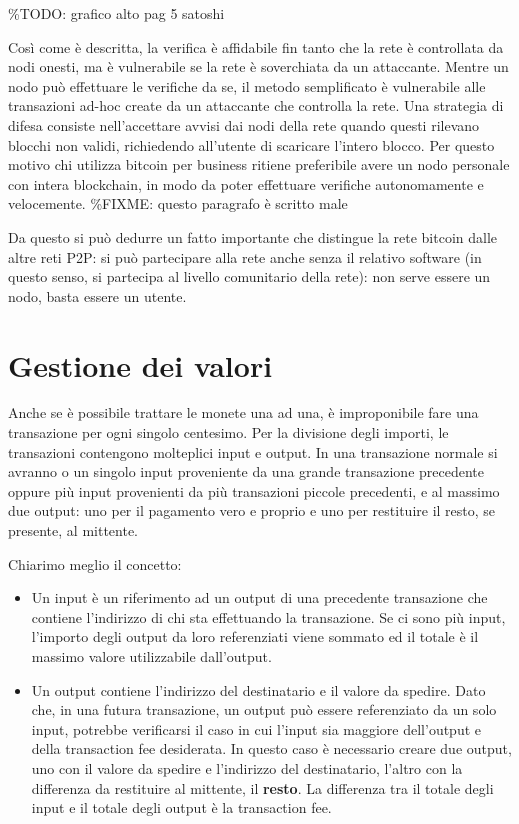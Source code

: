 \%TODO: grafico alto pag 5 satoshi

Così come è descritta, la verifica è affidabile fin tanto che la rete è
controllata da nodi onesti, ma è vulnerabile se la rete è soverchiata da
un attaccante. Mentre un nodo può effettuare le verifiche da se, il
metodo semplificato è vulnerabile alle transazioni ad-hoc create da un
attaccante che controlla la rete. Una strategia di difesa consiste
nell'accettare avvisi dai nodi della rete quando questi rilevano blocchi
non validi, richiedendo all'utente di scaricare l'intero blocco. Per
questo motivo chi utilizza bitcoin per business ritiene preferibile
avere un nodo personale con intera blockchain, in modo da poter
effettuare verifiche autonomamente e velocemente. \%FIXME: questo
paragrafo è scritto male

Da questo si può dedurre un fatto importante che distingue la rete
bitcoin dalle altre reti P2P: si può partecipare alla rete anche senza
il relativo software (in questo senso, si partecipa al livello
comunitario della rete): non serve essere un nodo, basta essere un
utente.

\section{Gestione dei valori}\label{gestione-dei-valori}

Anche se è possibile trattare le monete una ad una, è improponibile fare
una transazione per ogni singolo centesimo. Per la divisione degli
importi, le transazioni contengono molteplici input e output. In una
transazione normale si avranno o un singolo input proveniente da una
grande transazione precedente oppure più input provenienti da più
transazioni piccole precedenti, e al massimo due output: uno per il
pagamento vero e proprio e uno per restituire il resto, se presente, al
mittente.

Chiarimo meglio il concetto:

\begin{itemize}
\itemsep1pt\parskip0pt
\item
  Un input è un riferimento ad un output di una precedente transazione
  che contiene l'indirizzo di chi sta effettuando la transazione. Se ci
  sono più input, l'importo degli output da loro referenziati viene
  sommato ed il totale è il massimo valore utilizzabile dall'output.
\item
  Un output contiene l'indirizzo del destinatario e il valore da
  spedire. Dato che, in una futura transazione, un output può essere
  referenziato da un solo input, potrebbe verificarsi il caso in cui
  l'input sia maggiore dell'output e della transaction fee desiderata.
  In questo caso è necessario creare due output, uno con il valore da
  spedire e l'indirizzo del destinatario, l'altro con la differenza da
  restituire al mittente, il \textbf{resto}. La differenza tra il totale
  degli input e il totale degli output è la transaction fee.
\end{itemize}

